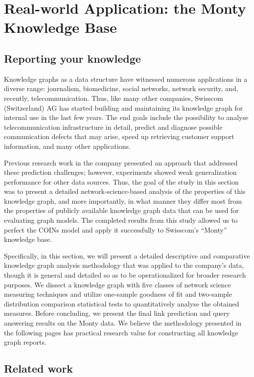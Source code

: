 \section{Real-world Application: the Monty Knowledge Base}
\label{sec: swisscom}

\subsection{Reporting your knowledge}

Knowledge graphs as a data structure have witnessed numerous applications in a diverse range: journalism, biomedicine, social networks, network security, and, recently, telecommunication. Thus, like many other companies, Swisscom (Switzerland) AG has started building and maintaining its knowledge graph for internal use in the last few years. The end goals include the possibility to analyse telecommunication infrastructure in detail, predict and diagnose possible communication defects that may arise, speed up retrieving customer support information, and many other applications.

Previous research work in the company presented an approach that addressed these prediction challenges; however, experiments showed weak generalization performance for other data sources. Thus, the goal of the study in this section was to present a detailed network-science-based analysis of the properties of this knowledge graph, and more importantly, in what manner they differ most from the properties of publicly available knowledge graph data that can be used for evaluating graph models. The completed results from this study allowed us to perfect the COINs model and apply it successfully to Swisscom's \enquote{Monty} knowledge base. 

Specifically, in this section, we will present a detailed descriptive and comparative knowledge graph analysis methodology that was applied to the company's data, though it is general and detailed so as to be operationalized for broader research purposes. We dissect a knowledge graph with five classes of network science measuring techniques and utilize one-sample goodness of fit and two-sample distribution comparison statistical tests to quantitatively analyse the obtained measures. Before concluding, we present the final link prediction and query answering results on the Monty data. We believe the methodology presented in the following pages has practical research value for constructing all knowledge graph reports. 

\subsection{Related work}
\label{sec:related_work}

